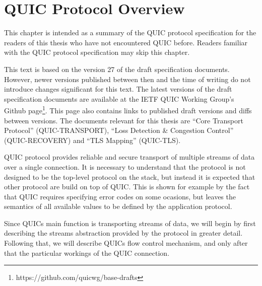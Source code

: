
\chapter{QUIC Protocol Overview}\label{chap:02-quic}


This chapter is intended as a summary of the QUIC protocol specification for the readers of this
thesis who have not encountered QUIC before. Readers familiar with the QUIC protocol specification
may skip this chapter.

This text is based on the version 27 of the draft specification documents. However, newer versions
published between then and the time of writing do not introduce changes significant for this text.
The latest versions of the draft specification documents are available at the IETF QUIC Working
Group's Github page\footnote{https://github.com/quicwg/base-drafts}. This page also contains links
to published draft versions and diffs between versions. The documents relevant for this thesis are
``Core Transport Protocol'' (QUIC-TRANSPORT), ``Loss Detection \& Congestion Control''
(QUIC-RECOVERY) and ``TLS Mapping'' (QUIC-TLS).

QUIC protocol provides reliable and secure transport of multiple streams of data over a single
connection. It is necessary to understand that the protocol is not designed to be the top-level
protocol on the stack, but instead it is expected that other protocol are build on top of QUIC\@.
This is shown for example by the fact that QUIC requires specifying error codes on some ocasions,
but leaves the semantics of all available values to be defined by the application protocol.


Since QUICs main function is transporting streams of data, we will begin by first describing the
streams abstraction provided by the protocol in greater detail. Following that, we will describe
QUICs flow control mechanism, and only after that the particular workings of the QUIC connection.




